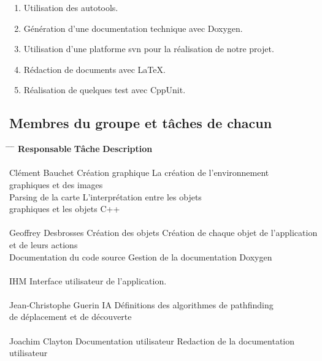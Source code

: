 \documentclass[a4paper 12pts]{article}
\begin{document}
\begin{enumerate}
\item Utilisation des autotools.
\item Génération d'une documentation technique avec Doxygen.
\item Utilisation d'une platforme svn pour la réalisation de notre projet.
\item Rédaction de documents avec \LaTeX .
\item Réalisation de quelques test avec CppUnit.

\end{enumerate}

\vspace{075 cm}

\subsection{Membres du groupe et tâches de chacun}


\vspace{1 cm}

\begin{tabbing}

\hspace{3.8cm} \= \hspace{5.2cm} \= \hspace{2cm} \= \kill
\textbf{Responsable} \> \textbf{Tâche} \> \textbf {Description} \\
\\
Clément Bauchet \> Création graphique \> La création de l'environnement \\
 \> \>graphiques et des images \\					
\> Parsing de la carte \>L'interprétation entre les objets \\
\> \> graphiques et les objets C++\\					
\\
Geoffrey Desbrosses \> Création des objets \> Création de chaque objet de l'application\\
\> \> et de leurs actions\\
\> Documentation du code source \> Gestion de la documentation Doxygen \\ 
\\
\> IHM \> Interface utilisateur de l'application. \> \\
\\
Jean-Christophe Guerin \> IA  \> Définitions des algorithmes de pathfinding\\
\> \> de déplacement et de découverte\\	
\\
Joachim Clayton \> Documentation utilisateur \> Redaction de la documentation utilisateur \\
\\ 
\end{tabbing}
\end{document}
